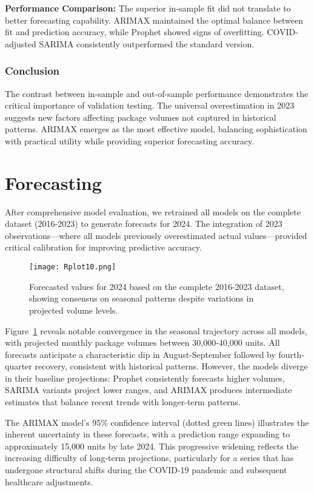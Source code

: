 \documentclass[10pt]{article}
\begin{document}
\textbf{Performance Comparison:} The superior in-sample fit did not translate to better forecasting capability. ARIMAX maintained the optimal balance between fit and prediction accuracy, while Prophet showed signs of overfitting. COVID-adjusted SARIMA consistently outperformed the standard version.

\subsubsection{Conclusion}
The contrast between in-sample and out-of-sample performance demonstrates the critical importance of validation testing. The universal overestimation in 2023 suggests new factors affecting package volumes not captured in historical patterns. ARIMAX emerges as the most effective model, balancing sophistication with practical utility while providing superior forecasting accuracy.


\section{Forecasting}

After comprehensive model evaluation, we retrained all models on the complete dataset (2016-2023) to generate forecasts for 2024. The integration of 2023 observations—where all models previously overestimated actual values—provided critical calibration for improving predictive accuracy.

\begin{figure}[ht]
\centering
\texttt{[image: Rplot10.png]}
\caption{Forecasted values for 2024 based on the complete 2016-2023 dataset, showing consensus on seasonal patterns despite variations in projected volume levels.}
\label{fig:forecast_2024}
\end{figure}

Figure~\ref{fig:forecast_2024} reveals notable convergence in the seasonal trajectory across all models, with projected monthly package volumes between 30,000-40,000 units. All forecasts anticipate a characteristic dip in August-September followed by fourth-quarter recovery, consistent with historical patterns. However, the models diverge in their baseline projections: Prophet consistently forecasts higher volumes, SARIMA variants project lower ranges, and ARIMAX produces intermediate estimates that balance recent trends with longer-term patterns.

The ARIMAX model's 95\% confidence interval (dotted green lines) illustrates the inherent uncertainty in these forecasts, with a prediction range expanding to approximately 15,000 units by late 2024. This progressive widening reflects the increasing difficulty of long-term projections, particularly for a series that has undergone structural shifts during the COVID-19 pandemic and subsequent healthcare adjustments.
\end{document}
